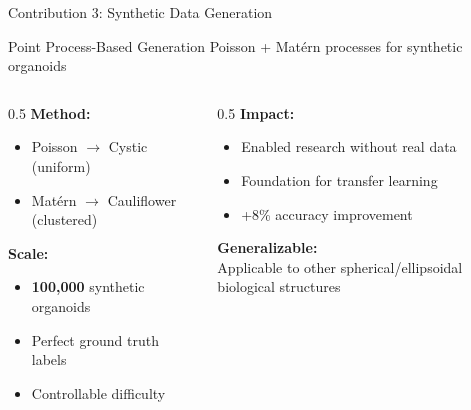 \documentclass[aspectratio=169]{beamer}
\begin{document}
\begin{frame}{Contribution 3: Synthetic Data Generation}
    \begin{block}{Point Process-Based Generation}
        Poisson + Matérn processes for synthetic organoids
    \end{block}
    
    \vspace{0.5em}
    \begin{columns}
        \begin{column}{0.5\textwidth}
            \textbf{Method:}
            \begin{itemize}
                \item Poisson $\rightarrow$ Cystic (uniform)
                \item Matérn $\rightarrow$ Cauliflower (clustered)
            \end{itemize}
            
            \vspace{0.5em}
            \textbf{Scale:}
            \begin{itemize}
                \item \textbf{100,000} synthetic organoids
                \item Perfect ground truth labels
                \item Controllable difficulty
            \end{itemize}
        \end{column}
        \begin{column}{0.5\textwidth}
            \textbf{Impact:}
            \begin{itemize}
                \item Enabled research without real data
                \item Foundation for transfer learning
                \item +8\% accuracy improvement
            \end{itemize}
            
            \vspace{0.5em}
            \textbf{Generalizable:}\\
            Applicable to other spherical/ellipsoidal biological structures
        \end{column}
    \end{columns}
\end{frame}
\end{document}
